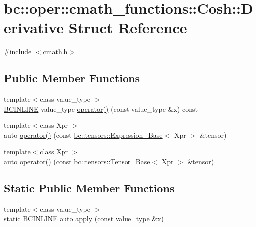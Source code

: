 \hypertarget{structbc_1_1oper_1_1cmath__functions_1_1Cosh_1_1Derivative}{}\section{bc\+:\+:oper\+:\+:cmath\+\_\+functions\+:\+:Cosh\+:\+:Derivative Struct Reference}
\label{structbc_1_1oper_1_1cmath__functions_1_1Cosh_1_1Derivative}


{\ttfamily \#include $<$cmath.\+h$>$}

\subsection*{Public Member Functions}
\begin{DoxyCompactItemize}
\item 
{\footnotesize template$<$class value\+\_\+type $>$ }\\\hyperlink{common_8h_a6699e8b0449da5c0fafb878e59c1d4b1}{B\+C\+I\+N\+L\+I\+NE} value\+\_\+type \hyperlink{structbc_1_1oper_1_1cmath__functions_1_1Cosh_1_1Derivative_ac2b5e4f159c2cea667615d96d4cb32db}{operator()} (const value\+\_\+type \&x) const
\item 
{\footnotesize template$<$class Xpr $>$ }\\auto \hyperlink{structbc_1_1oper_1_1cmath__functions_1_1Cosh_1_1Derivative_add5b5b9092ee2bb86cdb991807b3639a}{operator()} (const \hyperlink{classbc_1_1tensors_1_1Expression__Base}{bc\+::tensors\+::\+Expression\+\_\+\+Base}$<$ Xpr $>$ \&tensor)
\item 
{\footnotesize template$<$class Xpr $>$ }\\auto \hyperlink{structbc_1_1oper_1_1cmath__functions_1_1Cosh_1_1Derivative_a0ee0147408616167b295599904b17c3a}{operator()} (const \hyperlink{classbc_1_1tensors_1_1Tensor__Base}{bc\+::tensors\+::\+Tensor\+\_\+\+Base}$<$ Xpr $>$ \&tensor)
\end{DoxyCompactItemize}
\subsection*{Static Public Member Functions}
\begin{DoxyCompactItemize}
\item 
{\footnotesize template$<$class value\+\_\+type $>$ }\\static \hyperlink{common_8h_a6699e8b0449da5c0fafb878e59c1d4b1}{B\+C\+I\+N\+L\+I\+NE} auto \hyperlink{structbc_1_1oper_1_1cmath__functions_1_1Cosh_1_1Derivative_a9234276066e29ca51e40c39542fe0f75}{apply} (const value\+\_\+type \&x)
\end{DoxyCompactItemize}



